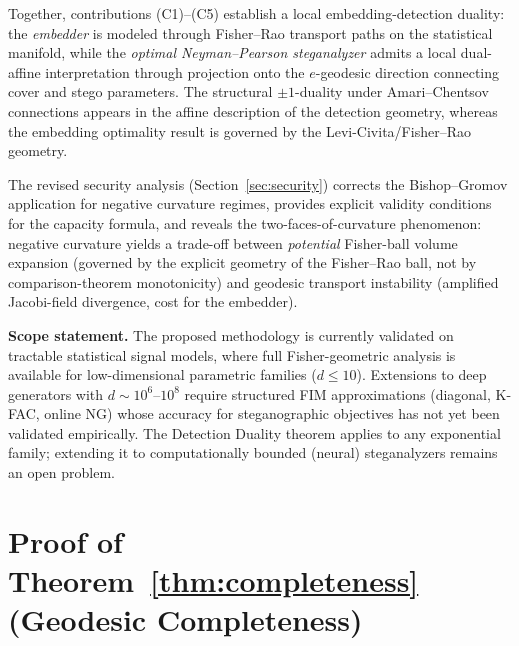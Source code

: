 \documentclass[a4paper,fleqn]{cas-dc}
\begin{document}
Together, contributions (C1)--(C5) establish a local embedding-detection
duality:
the \emph{embedder} is modeled through Fisher--Rao transport paths on the
statistical manifold, while the \emph{optimal Neyman--Pearson steganalyzer}
admits a local dual-affine interpretation through projection onto the
$e$-geodesic direction connecting cover and stego parameters. The
structural $\pm1$-duality under Amari--Chentsov connections appears in the
affine description of the detection geometry, whereas the embedding
optimality result is governed by the Levi-Civita/Fisher--Rao geometry.

The revised security analysis (Section~\ref{sec:security}) corrects the
Bishop--Gromov application for negative curvature regimes, provides
explicit validity conditions for the capacity formula, and reveals the
two-faces-of-curvature phenomenon: negative curvature yields a trade-off
between \emph{potential} Fisher-ball volume expansion (governed by the explicit
geometry of the Fisher--Rao ball, not by comparison-theorem monotonicity)
and geodesic transport instability (amplified Jacobi-field divergence,
cost for the embedder).

\textbf{Scope statement.}
The proposed methodology is currently validated on tractable statistical
signal models, where full Fisher-geometric analysis is available for
low-dimensional parametric families ($d \leq 10$). Extensions to deep
generators with $d \sim 10^6$--$10^8$ require structured FIM
approximations (diagonal, K-FAC, online NG) whose accuracy for
steganographic objectives has not yet been validated empirically.
The Detection Duality theorem applies to any exponential family;
extending it to computationally bounded (neural) steganalyzers remains
an open problem.



%



\appendix

\section{Proof of Theorem~\ref{thm:completeness} (Geodesic Completeness)}
\label{app:completeness}
\end{document}
